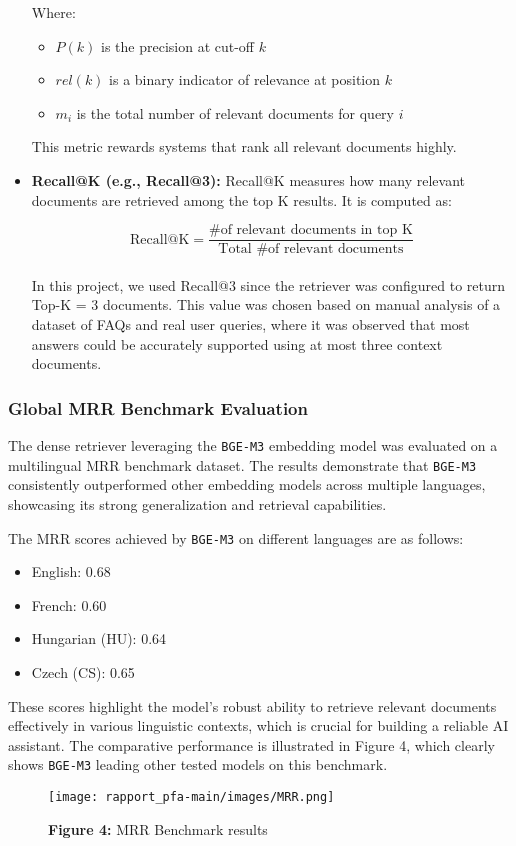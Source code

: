 \begin{itemize}
    Where:
    \begin{itemize}
        \item $P(k)$ is the precision at cut-off $k$
        \item $rel(k)$ is a binary indicator of relevance at position $k$
        \item $m_i$ is the total number of relevant documents for query $i$
    \end{itemize}
    
    This metric rewards systems that rank all relevant documents highly.

    \item \textbf{Recall@K (e.g., Recall@3):}
    Recall@K measures how many relevant documents are retrieved among the top K results. It is computed as:
    
    \begin{equation*}
    \text{Recall@K} = \frac{\text{\# of relevant documents in top K}}{\text{Total \# of relevant documents}}
    \end{equation*}
    \\
    In this project, we used Recall@3 since the retriever was configured to return Top-K = 3 documents. This value was chosen based on manual analysis of a dataset of FAQs and real user queries, where it was observed that most answers could be accurately supported using at most three context documents.
\end{itemize}

\subsubsection{Global MRR Benchmark Evaluation}
The dense retriever leveraging the \texttt{BGE-M3} embedding model was evaluated on a multilingual MRR benchmark dataset. The results demonstrate that \texttt{BGE-M3} consistently outperformed other embedding models across multiple languages, showcasing its strong generalization and retrieval capabilities.

The MRR scores achieved by \texttt{BGE-M3} on different languages are as follows:
\begin{itemize}
    \item English: 0.68
    \item French: 0.60
    \item Hungarian (HU): 0.64
    \item Czech (CS): 0.65
\end{itemize}

These scores highlight the model's robust ability to retrieve relevant documents effectively in various linguistic contexts, which is crucial for building a reliable AI assistant. The comparative performance is illustrated in Figure 4, which clearly shows \texttt{BGE-M3} leading other tested models on this benchmark.
\begin{figure}[htbp]
  \centering
  \texttt{[image: rapport\_pfa-main/images/MRR.png]}
  \caption*{\textbf{Figure 4:} MRR Benchmark results} %
  \label{fig:indexing-process-manual}
\end{figure}


